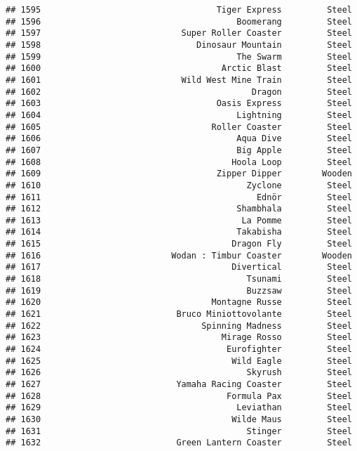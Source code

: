 \documentclass[
]{article}
\begin{document}
\begin{verbatim}
## 1595                                   Tiger Express         Steel
## 1596                                       Boomerang         Steel
## 1597                            Super Roller Coaster         Steel
## 1598                               Dinosaur Mountain         Steel
## 1599                                       The Swarm         Steel
## 1600                                    Arctic Blast         Steel
## 1601                            Wild West Mine Train         Steel
## 1602                                          Dragon         Steel
## 1603                                   Oasis Express         Steel
## 1604                                       Lightning         Steel
## 1605                                  Roller Coaster         Steel
## 1606                                       Aqua Dive         Steel
## 1607                                       Big Apple         Steel
## 1608                                      Hoola Loop         Steel
## 1609                                   Zipper Dipper        Wooden
## 1610                                         Zyclone         Steel
## 1611                                           Ednör         Steel
## 1612                                       Shambhala         Steel
## 1613                                        La Pomme         Steel
## 1614                                       Takabisha         Steel
## 1615                                      Dragon Fly         Steel
## 1616                          Wodan : Timbur Coaster        Wooden
## 1617                                      Divertical         Steel
## 1618                                         Tsunami         Steel
## 1619                                         Buzzsaw         Steel
## 1620                                  Montagne Russe         Steel
## 1621                           Bruco Miniottovolante         Steel
## 1622                                Spinning Madness         Steel
## 1623                                    Mirage Rosso         Steel
## 1624                                     Eurofighter         Steel
## 1625                                      Wild Eagle         Steel
## 1626                                         Skyrush         Steel
## 1627                           Yamaha Racing Coaster         Steel
## 1628                                     Formula Pax         Steel
## 1629                                       Leviathan         Steel
## 1630                                      Wilde Maus         Steel
## 1631                                         Stinger         Steel
## 1632                           Green Lantern Coaster         Steel

\end{verbatim}
\end{document}
